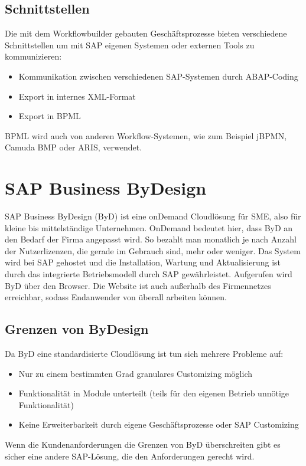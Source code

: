 \documentclass{handout}
\begin{document}
\normalsize

\subsection{Schnittstellen}

Die mit dem Workflowbuilder gebauten Geschäftsprozesse bieten verschiedene Schnittstellen um mit SAP eigenen Systemen oder externen Tools zu kommunizieren:

\begin{itemize}
\item Kommunikation zwischen verschiedenen SAP-Systemen durch ABAP-Coding
\item Export in internes XML-Format
\item Export in BPML
\end{itemize}

BPML wird auch von anderen Workflow-Systemen, wie zum Beispiel jBPMN, Camuda BMP oder ARIS, verwendet.

\section{SAP Business ByDesign}

SAP Business ByDesign (ByD) ist eine onDemand Cloudlösung für SME, also für kleine bis mittelständige Unternehmen. OnDemand bedeutet hier, dass ByD an den Bedarf der Firma angepasst wird. So bezahlt man monatlich je nach Anzahl der Nutzerlizenzen, die gerade im Gebrauch sind, mehr oder weniger. Das System wird bei SAP gehostet und die Installation, Wartung und Aktualisierung ist durch das integrierte Betriebsmodell durch SAP gewährleistet. Aufgerufen wird ByD über den Browser. Die Website ist auch außerhalb des Firmennetzes erreichbar, sodass Endanwender von überall arbeiten können.

\subsection{Grenzen von ByDesign}

Da ByD eine standardisierte Cloudlösung ist tun sich mehrere Probleme auf:

\begin{itemize}
\item Nur zu einem bestimmten Grad granulares Customizing möglich
\item Funktionalität in Module unterteilt (teils für den eigenen Betrieb unnötige Funktionalität)
\item Keine Erweiterbarkeit durch eigene Geschäftsprozesse oder SAP Customizing
\end{itemize}

Wenn die Kundenanforderungen die Grenzen von ByD überschreiten gibt es sicher eine andere SAP-Lösung, die den Anforderungen gerecht wird.


\newpage


\end{document}
